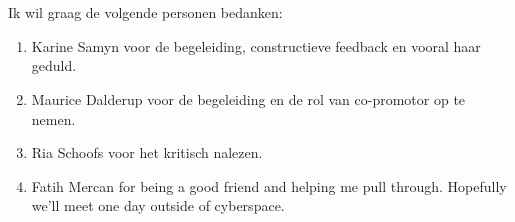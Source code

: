 
\chapter*{}
\label{ch:voorwoord}


Ik wil graag de volgende personen bedanken:

\begin{enumerate}
\item Karine Samyn voor de begeleiding, constructieve feedback en vooral haar geduld.
\item Maurice Dalderup voor de begeleiding en de rol van co-promotor op te nemen.
\item Ria Schoofs voor het kritisch nalezen.
\item Fatih Mercan for being a good friend and helping me pull through. Hopefully we'll meet one day outside of cyberspace. 
\end{enumerate}

